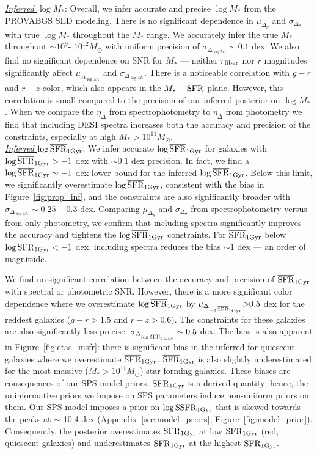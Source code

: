 \noindent \underline{\emph{Inferred $\log M_*$}}: 
Overall, we infer accurate and precise $\log M_*$ from the {\sc PROVABGS} SED
modeling. 
There is no significant dependence in $\mu_{\Delta_{\theta}}$ and
$\sigma_{\Delta_{\theta}}$ with true $\log M_*$ throughout the $M_*$ range. 
We accurately infer the true $M_*$ throughout ${\sim}10^{9}$- $10^{12} M_\odot$
with uniform precision of $\sigma_{\Delta_{\log M_*}}{\sim}0.1$ dex. 
We also find no significant dependence on SNR for $M_*$ --- neither $r_{\rm
fiber}$ nor $r$ magnitudes significantly affect $\mu_{\Delta_{\log M_*}}$ and
$\sigma_{\Delta_{\log M_*}}$.
There is a noticeable correlation with $g-r$ and $r-z$ color, which also
appears in the $M_*-{\rm SFR}$ plane. 
However, this correlation is small compared to the precision of our inferred
posterior on $\log M_*$. 
When we compare the $\eta_\Delta$ from spectrophotometry to $\eta_\Delta$ from
photometry we find that including DESI spectra increases both the accuracy and
precision of the constraints, especially at high $M_* > 10^{11}M_\odot$. \\

\noindent \underline{\emph{Inferred $\log\overline{\rm SFR}_{\rm 1Gyr}$}}: 
We infer accurate $\log\overline{\rm SFR}_{\rm 1Gyr}$ for galaxies with $\log\overline{\rm SFR}_{\rm 1Gyr} > -1$ dex with
${\sim} 0.1$ dex precision. 
In fact, we find a $\log \overline{\rm SFR}_{\rm 1Gyr} \sim -1$ dex lower bound for the inferred
$\log \overline{\rm SFR}_{\rm 1Gyr}$.
Below this limit, we significantly overestimate $\log \overline{\rm SFR}_{\rm 1Gyr}$, consistent with
the bias in Figure~\ref{fig:prop_inf}, and the constraints are also
significantly broader with $\sigma_{\Delta_{\log M_*}}{\sim}0.25 - 0.3$ dex.
Comparing $\mu_{\Delta_{\theta}}$ and $\sigma_{\Delta_{\theta}}$ from
spectrophotometry versus from only photometry, we confirm that including
spectra significantly improves the accuracy and tightens the $\log\overline{\rm SFR}_{\rm 1Gyr}$
constraints.
For $\overline{\rm SFR}_{\rm 1Gyr}$ below $\log\overline{\rm SFR}_{\rm 1Gyr} < -1$ dex, including spectra reduces the bias
${\sim}1$ dex --- an order of magnitude. 

We find no significant correlation between the accuracy and precision of
$\overline{\rm SFR}_{\rm 1Gyr}$ with spectral or photometric SNR.
However, there is a more significant color dependence where we overestimate
$\log\overline{\rm SFR}_{\rm 1Gyr}$ by $\mu_{\Delta_{\log\overline{\rm SFR}_{\rm 1Gyr}}}{>}0.5$ dex for the reddest galaxies
($g-r > 1.5$ and $r-z> 0.6$).
The constraints for these galaxies are also significantly less precise:
$\sigma_{\Delta_{\log\overline{\rm SFR}_{\rm 1Gyr}}} \sim 0.5$ dex. 
The bias is also apparent in Figure~\ref{fig:etas_msfr}: there is significant
bias in the inferred for quiescent galaxies where we overestimate $\overline{\rm SFR}_{\rm 1Gyr}$. 
$\overline{\rm SFR}_{\rm 1Gyr}$ is also slightly underestimated for the most massive ($M_* >
10^{11}M_\odot$) star-forming galaxies. 
These biases are consequences of our SPS model priors.
$\overline{\rm SFR}_{\rm 1Gyr}$ is a derived quantity; hence, the uninformative priors we impose on
SPS parameters induce non-uniform priors on them.
Our SPS model imposes a prior on $\log \overline{\rm SSFR}_{\rm 1 Gyr}$
that is skewed towards the peaks at $\sim$-10.4 dex
(Appendix~\ref{sec:model_priors}, Figure~\ref{fig:model_prior}). 
Consequently, the posterior overestimates $\overline{\rm SFR}_{\rm 1Gyr}$ at low $\overline{\rm SFR}_{\rm 1Gyr}$ (red,
quiescent galaxies) and underestimates $\overline{\rm SFR}_{\rm 1Gyr}$ at the highest $\overline{\rm SFR}_{\rm 1Gyr}$. \\

